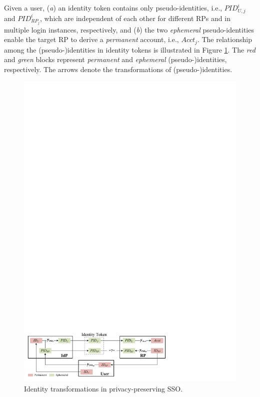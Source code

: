 Given a user,
    (\emph{a}) an identity token contains only pseudo-identities, i.e., $PID_{U,j}^i$ and $PID_{RP_j}^i$,
        which are independent of each other for different RPs and in multiple login instances, respectively,
    and (\emph{b}) the two \emph{ephemeral} pseudo-identities enable the target RP to derive a \emph{permanent} account, i.e., $Acct_j$.
The relationship among the (pseudo-)identities in identity tokens is illustrated in Figure \ref{fig:IDCorrelation}.
The \emph{red} and \emph{green} blocks represent \emph{permanent} and \emph{ephemeral} (pseudo-)identities, respectively.
The arrows denote the transformations of (pseudo-)identities.


\begin{figure}[bt]
  \centering
  \includegraphics[width=0.98\linewidth]{fig/IDCorrelation.pdf}
  \caption{Identity transformations in privacy-preserving SSO.}
  \label{fig:IDCorrelation}
\end{figure}

